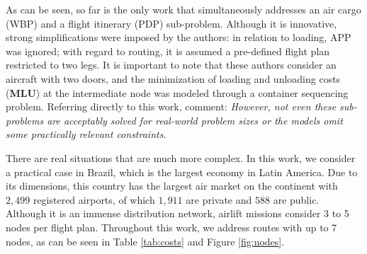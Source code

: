 \documentclass[preprint,authoryear]{elsarticle}
\begin{document}
As can be seen, so far \cite{LurkinSchyns2015} is the only work that simultaneously addresses an air cargo (WBP) and a flight itinerary (PDP) sub-problem. Although it is innovative, strong simplifications were imposed by the authors: in relation to loading, APP was ignored; with regard to routing, it is assumed a pre-defined flight plan restricted to two legs. It is important to note that these authors consider an aircraft with two doors, and the minimization of loading and unloading costs ({\bf MLU}) at the intermediate node was modeled through a container sequencing problem. Referring directly to this work, \cite[p. 409]{BrandtStefan2019} comment: {\it However, not even these sub-problems are acceptably solved for real-world problem sizes or the models omit some practically relevant constraints}. 

There are real situations that are much more complex. In this work, we consider a practical case in Brazil, which is the largest economy in Latin America. Due to its dimensions, this country has the largest air market on the continent with $2,499$\/ registered airports, of which $1,911$\/ are private and $588$\/ are public. Although it is an immense distribution network, airlift missions consider 3 to 5 nodes per flight plan. Throughout this work, we address routes with up to 7 nodes, as can be seen in Table \ref{tab:costs} and Figure \ref{fig:nodes}.
\end{document}
